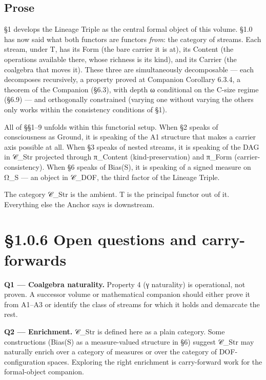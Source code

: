 \documentclass[11pt, openany]{book}
\newcommand{\sectionbreak}{\clearpage}
\begin{document}
\subsection{Prose}

§1 develops the Lineage Triple as the central formal object of this volume. §1.0 has now said what both functors are functors \textit{from}: the category of streams. Each stream, under T, has its Form (the bare carrier it is at), its Content (the operations available there, whose richness is its kind), and its Carrier (the coalgebra that moves it). These three are simultaneously decomposable --- each decomposes recursively, a property proved at Companion Corollary 6.3.4, a theorem of the Companion (§6.3), with depth ω conditional on the C-size regime (§6.9) --- and orthogonally constrained (varying one without varying the others only works within the consistency conditions of §1).

All of §§1–9 unfolds within this functorial setup. When §2 speaks of consciousness as Ground, it is speaking of the A1 structure that makes a carrier axis possible at all. When §3 speaks of nested streams, it is speaking of the DAG in 𝒞\_\allowbreak{}Str projected through π\_\allowbreak{}Content (kind-preservation) and π\_\allowbreak{}Form (carrier-consistency). When §6 speaks of Bias(S), it is speaking of a signed measure on Ω\_\allowbreak{}S --- an object in 𝒞\_\allowbreak{}DOF, the third factor of the Lineage Triple.

The category 𝒞\_\allowbreak{}Str is the ambient. T is the principal functor out of it. Everything else the Anchor says is downstream.

\sectionbreak

\section{§1.0.6 Open questions and carry-forwards}

\textbf{Q1 --- Coalgebra naturality.} Property 4 (γ naturality) is operational, not proven. A successor volume or mathematical companion should either prove it from A1–A3 or identify the class of streams for which it holds and demarcate the rest.

\textbf{Q2 --- Enrichment.} 𝒞\_\allowbreak{}Str is defined here as a plain category. Some constructions (Bias(S) as a measure-valued structure in §6) suggest 𝒞\_\allowbreak{}Str may naturally enrich over a category of measures or over the category of DOF-configuration spaces. Exploring the right enrichment is carry-forward work for the formal-object companion.
\end{document}
